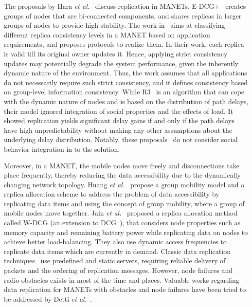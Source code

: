 The proposals by Hara {\it et al.}~\cite{THara2009}\cite{THara2006} discuss replication in MANETs. E-DCG+~\cite{THara2006} creates groups of nodes that are bi-connected components, and shares replicas in larger groups of nodes to provide high stability. The work in~\cite{THara2009} aims at classifying different replica consistency levels in a MANET based on application requirements, and proposes protocols to realize them. In their work, each replica is valid till its original owner updates it. Hence, applying strict consistency updates may potentially degrade the system performance, given the inherently dynamic nature of the environment. Thus, the work assumes that all applications do not necessarily require such strict consistency, and it defines consistency based on group-level information consistency. While R3~\cite{XTie2011} is an algorithm that can cope with the dynamic nature of nodes and is based on the distribution of path delays, their model ignored integration of social properties and the effects of load. It showed replication yields significant delay gains if and only if the path delays have high unpredictability without making any other assumptions about the underlying delay distribution. Notably, these proposals~\cite{THara2009}\cite{THara2006}\cite{XTie2011} do not consider social behavior integration in to the solution.

Moreover, in a MANET, the mobile nodes move freely and disconnections take place frequently, thereby reducing the data accessibility due to the dynamically changing network topology. Huang {\it et al.}~\cite{JLHuang2006} propose a group mobility model and a replica allocation scheme to address the problem of data accessibility by replicating data items and using the concept of group mobility, where a group of mobile nodes move together. Jain {\it et al.}~\cite{SJain2013} proposed a replica allocation method called W-DCG (an extension to DCG~\cite{THara2001}), that considers node properties such as memory capacity and remaining battery power while replicating data on nodes to achieve better load-balancing. They also use dynamic access frequencies to replicate data items which are currently in demand. Classic data replication techniques~\cite{YSaito2005} use predefined and static servers, requiring reliable delivery of packets and the ordering of replication messages. However, node failures and radio obstacles exists in most of the time and places. Valuable works regarding data replication for MANETs with obstacles and node failures have been tried to be addressed by Detti {\it et al.}~\cite{ADetti2010}.

